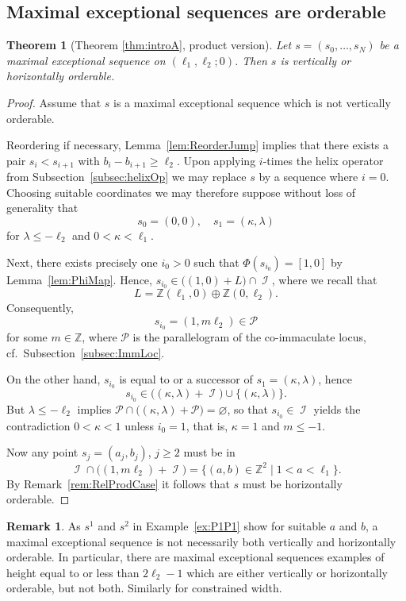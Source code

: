 \documentclass[11pt]{article}
\newtheorem{theorem}[theo]{Theorem}
\theoremstyle{definition}
\newtheorem{rema}[theo]{Remark}
\numberwithin{equation}{section}
\newcommand{\cP}{\mathcal{P}}
\newcommand{\Z}{\mathbb Z}
\newcommand{\CI}{{\mathcal I}}
\newcommand{\CP}{{\mathcal P}}
\newcommand{\nImm}{\operatorname{\CI}}
\newcommand{\cl}{s}
\newcommand{\mes}{maximal exceptional sequence}
\newcommand{\ssect}[1]{Subsection~\ref{#1}}
\newcommand{\thLex}{\ref{thm:introA}}
\begin{document}
\subsection{Maximal exceptional 
sequences are orderable}
\label{subsec:ReLExProdCase}

\begin{theorem}[Theorem {\thLex}, 
product version]
\label{thm:MESRelProdCase}
Let $\cl=(\cl_0,\ldots,\cl_N)$ 
be a maximal exceptional sequence on 
$(\ell_1,\ell_2;0)$. Then $\cl$ is 
vertically or horizontally orderable. 
\end{theorem}

\begin{proof}
{Assume that $\cl$ is a maximal 
exceptional sequence which is {not vertically} 
orderable.}

{Reordering if necessary, Lemma~\ref{lem:ReorderJump}
implies that there exists a pair $\cl_i<\cl_{i+1}$
with $b_i-b_{i+1}\geq\ell_2$. Upon
applying $i$-times the helix operator from 
\ssect{subsec:helixOp} we may replace $\cl$
by a sequence where $i=0$. Choosing suitable
coordinates we may therefore suppose
without loss of generality that
$$
\cl_0=(0,0),\quad\cl_1=(\kappa,\lambda)
$$
for $\lambda\leq-\ell_2$ and 
$0<\kappa<\ell_1$.}

{Next, there exists precisely 
one $i_0>0$ such that $\Phi(\cl_{i_0})=[1,0]$
by Lemma~\ref{lem:PhiMap}. Hence, 
$\cl_{i_0}\in\big((1,0)+L\big)\cap\nImm$, 
where we recall that
$$
L=\Z(\ell_1,0)\oplus\Z(0,\ell_2).
$$
Consequently, 
$$
\cl_{i_0}=(1,m\ell_2)\in\cP
$$
for some $m\in\Z$, where $\cP$ is the parallelogram of the 
{co-immaculate} locus, cf.\ Subsection~\ref{subsec:ImmLoc}.}

{On the other hand, $\cl_{i_0}$ is equal to or 
a successor of $\cl_1=(\kappa,\lambda)$, hence
$$
\cl_{i_0}\in\big((\kappa,\lambda)+\nImm\big)
\cup\{(\kappa,\lambda)\}.
$$
But $\lambda\leq-\ell_2$ implies 
$\cP\cap\big((\kappa,\lambda)+\CP\big)=\varnothing$, 
so that $\cl_{i_0}\in\nImm$ yields the contradiction 
$0<\kappa<1$ unless $i_0=1$, that is, $\kappa=1$ and $m\leq-1$.}

{Now any point $\cl_j=(a_j,b_j)$, $j\geq2$ must be in 
\[
\nImm\cap\big((1,m\ell_2)+\nImm\big)=\{(a,b)\in\Z^2\mid1<a<\ell_1\}. 
\]
By Remark~\ref{rem:RelProdCase} it follows that $\cl$ 
must be horizontally orderable.}
\end{proof}

\begin{rema}
As $\cl^1$ and $\cl^2$ in Example~\ref{ex:P1P1} 
show for suitable $a$ and $b$, a maximal 
exceptional sequence is not necessarily both 
vertically and horizontally orderable. In particular,
there are \mes s examples of height equal to or less than 
$2\ell_2-1$ which are either vertically or
horizontally orderable, but not both. 
Similarly for constrained width.
\end{rema}
\end{document}
